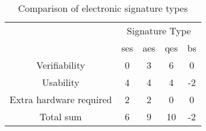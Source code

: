 \begin{table}[H]
	\begin{tabular}{|c|c|c|c|c|} \hline
		\rowcolor{Gray}\multirow{2}{*}{Criterion} & \multicolumn{4}{|c|}{Signature Type}\\
									& \gls{ses} & \gls{aes} & \gls{qes} & \gls{bs} \\ \cline{1-5}
		Verifiability 			& 0 & 3 & 6 & 0 \\ \hline
		Usability 				& 4 & 4 & 4 & -2 \\ \hline
		Extra hardware required & 2 & 2 & 0 & 0 \\ \hline \hline
		Total sum				& 6 & 9 & 10 & -2 \\ \hline
	\end{tabular}
	\centering
	\caption{Comparison of electronic signature types}
	\label{es:Tab:comp}
\end{table}